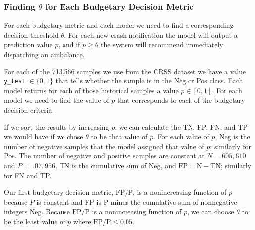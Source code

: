 \subsubsection{Finding $\theta$ for Each Budgetary Decision Metric}
\label{finding_theta}

For each budgetary metric and each model we need to find a corresponding decision threshold $\theta$.  For each new crash notification the model will output a prediction value $p$, and if $p \ge \theta$ the system will recommend immediately dispatching an ambulance.  

For each of the 713,566 samples we use from the CRSS dataset we have a value \verb|y_test| $\in \{0,1\}$ that tells whether the sample is in the Neg or Pos class.  Each model returns for each of those historical samples a value $p \in [0,1]$.  For each model we need to find the value of $p$ that corresponds to each of the budgetary decision criteria.  

If we sort the results by increasing $p$, we can calculate the TN, FP, FN, and TP we would have if we chose $\theta$ to be that value of $p$.  For each value of $p$, Neg is the number of negative samples that the model assigned that value of $p$; similarly for Pos.  The number of negative and positive samples are constant at $N=605,610$ and $P=107,956$. TN is the cumulative sum of Neg, and $\text{FP} = \text{N} - \text{TN}$; similarly for FN and TP.  

Our first budgetary decision metric, $\text{FP}/\text{P}$, is a nonincreasing function of $p$ because $P$ is constant and FP is P minus the cumulative sum of nonnegative integers Neg.  Because $\text{FP}/\text{P}$ is a nonincreasing function of $p$, we can choose $\theta$ to be the least value of $p$ where $\text{FP}/\text{P} \le 0.05$.


